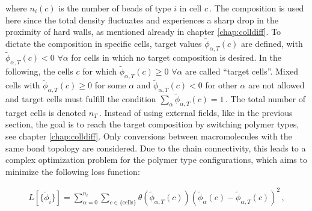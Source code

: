 \documentclass[bachelor,       %
               twoside,        %
               BCOR10mm,       %
               ngerman, english %
               ]{GAUBM}
\begin{document}
where $n_i(c)$ is the number of beads of type $i$ in cell $c\,.$ The composition is used here since the total density fluctuates and experiences a sharp drop in the proximity of hard walls, as mentioned already in chapter \ref{chap:colldiff}. To dictate the composition in specific cells, target values $\tilde\phi_{\alpha,T}(c)$ are defined, with $\tilde\phi_{\alpha,T}(c)<0$ $\forall\alpha$ for cells in which no target composition is desired. In the following, the cells $c$ for which $\tilde\phi_{\alpha,T}(c)\ge 0$ $\forall\alpha$ are called \enquote{target cells}. Mixed cells with $\tilde\phi_{\alpha,T}(c)\ge 0$ for some $\alpha$ and $\tilde\phi_{\alpha,T}(c)<0$ for other $\alpha$ are not allowed and target cells must fulfill the condition $\sum_\alpha\tilde\phi_{\alpha,T}(c)=1\, .$ The total number of target cells is denoted $n_T\,.$ Instead of using external fields, like in the previous section, the goal is to reach the target composition by switching polymer types, see chapter \ref{chap:colldiff}. Only conversions between macromolecules with the same bond topology are considered. Due to the chain connectivity, this leads to a complex optimization problem for the polymer type configurations, which aims to minimize the following loss function:

\begin{align}
    L[\{\tilde\phi_i\}]=\sum_{\alpha=0}^{n_t}\sum_{c\in \{\text{cells}\}}\theta(\tilde{\phi}_{\alpha,T}(c))\left(\tilde{\phi}_\alpha(c)-\tilde{\phi}_{\alpha,T}(c)\right)^2\,,
    \label{eq:lossfunction}
\end{align}
\end{document}
